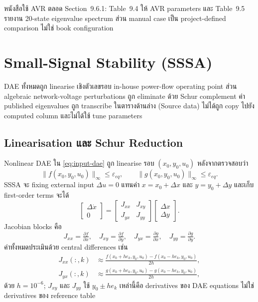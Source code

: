 \documentclass[12pt,a4paper]{article}
\begin{document}
หนังสือใช้ AVR ตลอด Section~9.6.1: Table~9.4 ให้ AVR parameters และ Table~9.5 รายงาน 20-state eigenvalue spectrum ส่วน manual case เป็น project-defined comparison ไม่ใช่ book configuration

\section{Small-Signal Stability (SSSA)}

DAE ทั้งหมดถูก linearise เชิงตัวเลขรอบ in-house power-flow operating point ส่วน algebraic network-voltage perturbations ถูก eliminate ด้วย Schur complement ค่า published eigenvalues ถูก transcribe ในตารางด้านล่าง (Source data) ไม่ได้ถูก copy ไปยัง computed column และไม่ได้ใช้ tune parameters

\subsection{Linearisation และ Schur Reduction}

Nonlinear DAE ใน \eqref{eq:input-dae} ถูก linearise รอบ $(x_0,y_0,u_0)$ หลังจากตรวจสอบว่า
\begin{equation}
\|f(x_0,y_0,u_0)\|_\infty\le\varepsilon_{eq},\qquad
\|g(x_0,y_0,u_0)\|_\infty\le\varepsilon_{eq}.
\end{equation}
SSSA จะ fixing external input $\Delta u=0$ แทนค่า $x=x_0+\Delta x$ และ $y=y_0+\Delta y$ และเก็บ first-order terms จะได้
\begin{equation}
\begin{bmatrix}\Delta\dot x\\0\end{bmatrix}
=
\begin{bmatrix}J_{xx}&J_{xy}\\J_{yx}&J_{yy}\end{bmatrix}
\begin{bmatrix}\Delta x\\\Delta y\end{bmatrix}.
\label{eq:sssa-linear-dae}
\end{equation}
Jacobian blocks คือ
\begin{equation}
J_{xx}=\tfrac{\partial f}{\partial x},\quad
J_{xy}=\tfrac{\partial f}{\partial y},\quad
J_{yx}=\tfrac{\partial g}{\partial x},\quad
J_{yy}=\tfrac{\partial g}{\partial y}.
\end{equation}
ค่าทั้งหมดประเมินด้วย central differences เช่น
\begin{align}
J_{xx}(:,k)&\approx
\frac{f(x_0+h e_k,y_0,u_0)-f(x_0-h e_k,y_0,u_0)}{2h},\\
J_{yx}(:,k)&\approx
\frac{g(x_0+h e_k,y_0,u_0)-g(x_0-h e_k,y_0,u_0)}{2h},
\end{align}
ด้วย $h=10^{-6}$; $J_{xy}$ และ $J_{yy}$ ใช้ $y_0\pm h e_k$ เหล่านี้คือ derivatives ของ DAE equations ไม่ใช่ derivatives ของ reference table
\end{document}
